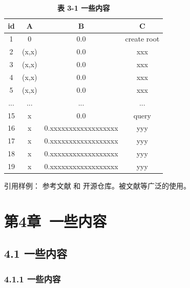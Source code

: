 \documentclass[10pt,a4paper]{report}
\begin{document}
\begin{table}[h]
    \centering
    \captionsetup{labelformat=empty, position=bottom}
    \caption{\songti\bfseries{} 表 3-1 一些内容}
    \begin{tabular}{cccc}
        \toprule
        id & A & B & C \\
        \midrule
        1 & 0 & 0.0 & create root \\
        2 & (x,x) & 0.0 & xxx \\
        3 & (x,x) & 0.0 & xxx \\
        4 & (x,x) & 0.0 & xxx \\
        5 & (x,x) & 0.0 & xxx \\
        ... & ... & ... & ... \\
        15 & x & 0.0 & query \\
        16 & x & 0.xxxxxxxxxxxxxxxxxx & yyy \\
        17 & x & 0.xxxxxxxxxxxxxxxxxx & yyy \\
        18 & x & 0.xxxxxxxxxxxxxxxxxx & yyy \\
        19 & x & 0.xxxxxxxxxxxxxxxxxx & yyy \\
        \bottomrule
    \end{tabular}
\end{table}

引用样例：
参考文献\cite{li2012finite} 和 开源仓库\cite{aburn2019fodeint}。被文献\cite{LIU2024106124}等广泛的使用。

\chapter{第4章\ 
一些内容}\label{ux7b2c3ux7ae0-gorest-ux4e00ux79cdux57faux4e8eux56feux7684ux7075ux6d3bux7684ux5927ux6570ux636eux8ba1ux7b97ux6846ux67b6ux6a21ux578b}

\section{4.1 一些内容}\label{31-ux56feux4e0eux8ba1ux7b97}

\subsection{4.1.1
一些内容}\label{343-gorestux4efbux52a1ux6d41ux7a0b}
\end{document}

